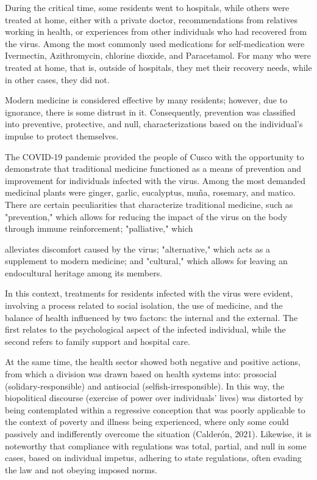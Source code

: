 \documentclass{article}
\begin{document}
During the critical time, some residents went to hospitals, while others were treated at home, either with a private doctor, recommendations from relatives working in health, or experiences from other individuals who had recovered from the virus. Among the most commonly used medications for self-medication were Ivermectin, Azithromycin, chlorine dioxide, and Paracetamol. For many who were treated at home, that is, outside of hospitals, they met their recovery needs, while in other cases, they did not.

Modern medicine is considered effective by many residents; however, due to ignorance, there is some distrust in it. Consequently, prevention was classified into preventive, protective, and null, characterizations based on the individual's impulse to protect themselves.

The COVID-19 pandemic provided the people of Cusco with the opportunity to demonstrate that traditional medicine functioned as a means of prevention and improvement for individuals infected with the virus. Among the most demanded medicinal plants were ginger, garlic, eucalyptus, muña, rosemary, and matico. There are certain peculiarities that characterize traditional medicine, such as "prevention," which allows for reducing the impact of the virus on the body through immune reinforcement; "palliative," which

alleviates discomfort caused by the virus; "alternative," which acts as a supplement to modern medicine; and "cultural," which allows for leaving an endocultural heritage among its members.

In this context, treatments for residents infected with the virus were evident, involving a process related to social isolation, the use of medicine, and the balance of health influenced by two factors: the internal and the external. The first relates to the psychological aspect of the infected individual, while the second refers to family support and hospital care.

At the same time, the health sector showed both negative and positive actions, from which a division was drawn based on health systems into: prosocial (solidary-responsible) and antisocial (selfish-irresponsible). In this way, the biopolitical discourse (exercise of power over individuals' lives) was distorted by being contemplated within a regressive conception that was poorly applicable to the context of poverty and illness being experienced, where only some could passively and indifferently overcome the situation (Calderón, 2021). Likewise, it is noteworthy that compliance with regulations was total, partial, and null in some cases, based on individual impetus, adhering to state regulations, often evading the law and not obeying imposed norms.
\end{document}
